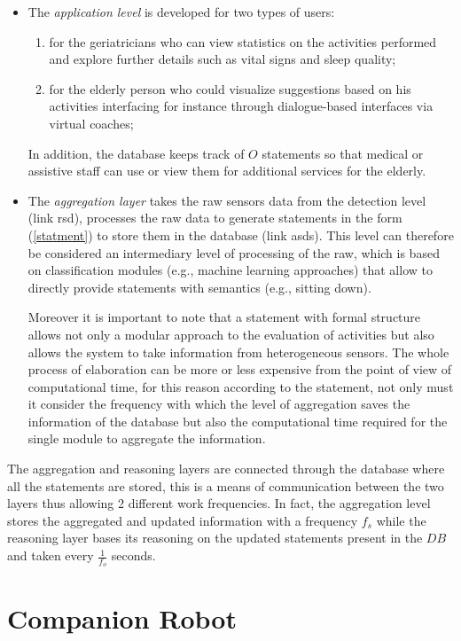 \documentclass{thesisreport}
\begin{document}
\begin{itemize}
    \item The \textit{application level} is developed for two types of users:
    \begin{enumerate}
        \item for the geriatricians who can view statistics on the activities performed and explore further details such as vital signs and sleep quality;
        \item for the elderly person who could visualize suggestions based on his activities interfacing for instance through dialogue-based interfaces via virtual coaches;
    \end{enumerate}
    In addition, the database keeps track of $O$ statements so that medical or assistive staff can use or view them for additional services for the elderly.
    \item The \textit{aggregation layer} takes the raw sensors data from the detection level (link rsd), processes the raw data to generate statements in the form (\ref{statment}) to store them in the database (link asds). This level can therefore be considered an intermediary level of processing of the raw, which is based on classification modules (e.g., machine learning approaches) that allow to directly provide statements with semantics (e.g., sitting down).
    
    Moreover it is important to note that a statement with formal structure allows not only a modular approach to the evaluation of activities but also allows the system to take information from heterogeneous sensors. The whole process of elaboration can be more or less expensive from the point of view of computational time, for this reason according to the statement, not only must it consider the frequency with which the level of aggregation saves the information of the database but also the computational time required for the single module to aggregate the information.
 \end{itemize}
 
  The aggregation and reasoning layers are connected through the database where all the statements are stored, this is a means of communication between the two layers thus allowing 2 different work frequencies. In fact, the aggregation level stores the aggregated and updated information with a frequency $f_s$ while the reasoning layer bases its reasoning on the updated statements present in the $DB$ and taken every $\frac{1}{f_o}$ seconds.
 
 \section{Companion Robot}  \label{companionRobot}
 
\end{document}

